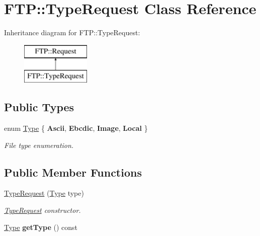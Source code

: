 \hypertarget{class_f_t_p_1_1_type_request}{\section{F\-T\-P\-:\-:Type\-Request Class Reference}
\label{class_f_t_p_1_1_type_request}
}
Inheritance diagram for F\-T\-P\-:\-:Type\-Request\-:\begin{figure}[H]
\begin{center}
\leavevmode
\includegraphics[height=2.000000cm]{class_f_t_p_1_1_type_request}
\end{center}
\end{figure}
\subsection*{Public Types}
\begin{DoxyCompactItemize}
\item 
enum \hyperlink{class_f_t_p_1_1_type_request_a504950a6fadf9efc043b6819170fca40}{Type} \{ {\bfseries Ascii}, 
{\bfseries Ebcdic}, 
{\bfseries Image}, 
{\bfseries Local}
 \}
\begin{DoxyCompactList}\small\item\em File type enumeration. \end{DoxyCompactList}\end{DoxyCompactItemize}
\subsection*{Public Member Functions}
\begin{DoxyCompactItemize}
\item 
\hyperlink{class_f_t_p_1_1_type_request_a9583c30f4e96a6a76afe3c8864c7ad32}{Type\-Request} (\hyperlink{class_f_t_p_1_1_type_request_a504950a6fadf9efc043b6819170fca40}{Type} type)
\begin{DoxyCompactList}\small\item\em \hyperlink{class_f_t_p_1_1_type_request}{Type\-Request} constructor. \end{DoxyCompactList}\item 
\hypertarget{class_f_t_p_1_1_type_request_a35f4fa506d33c326f6ee69435491f70f}{\hyperlink{class_f_t_p_1_1_type_request_a504950a6fadf9efc043b6819170fca40}{Type} {\bfseries get\-Type} () const }\label{class_f_t_p_1_1_type_request_a35f4fa506d33c326f6ee69435491f70f}

\end{DoxyCompactItemize}
